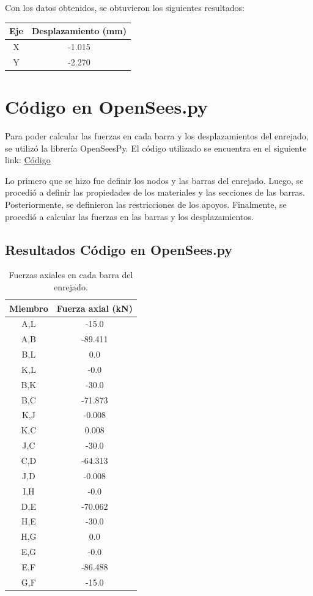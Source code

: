 \documentclass{article}  %
\begin{document}
Con los datos obtenidos, se obtuvieron los siguientes resultados:

\begin{table}[h]
  \centering
  
  \begin{tabular}{cc}
    \hline
    \textbf{Eje} & \textbf{Desplazamiento (mm)} \\
    \hline
    X & -1.015 \\
    Y & -2.270 \\
    \hline
  \end{tabular}
\end{table}

\newpage
\section{Código en OpenSees.py}
Para poder calcular las fuerzas en cada barra y los desplazamientos del enrejado, se utilizó la librería OpenSeesPy. El código utilizado se encuentra en el siguiente link: \href{https://github.com/berckanala/P2E0_MCOC/tree/main/c%C3%B3digo}{Código}

Lo primero que se hizo fue definir los nodos y las barras del enrejado. Luego, se procedió a definir las propiedades de los materiales y las secciones de las barras. Posteriormente, se definieron las restricciones de los apoyos. Finalmente, se procedió a calcular las fuerzas en las barras y los desplazamientos.

\subsection{Resultados Código en OpenSees.py}
\begin{table}[h!]
  \centering
  \begin{tabular}{|c|c|}
  \hline
  \textbf{Miembro} & \textbf{Fuerza axial (kN)} \\
  \hline
  A,L & -15.0   \\
  A,B & -89.411 \\
  B,L & 0.0     \\
  K,L & -0.0    \\
  B,K & -30.0   \\
  B,C & -71.873 \\
  K,J & -0.008  \\
  K,C & 0.008   \\
  J,C & -30.0   \\
  C,D & -64.313 \\
  J,D & -0.008  \\
  I,H & -0.0    \\
  D,E & -70.062 \\
  H,E & -30.0   \\
  H,G & 0.0     \\
  E,G & -0.0    \\
  E,F & -86.488 \\
  G,F & -15.0   \\
  \hline
  \end{tabular}
  \caption{Fuerzas axiales en cada barra del enrejado.}
  \label{tab:2}
\end{table}
\end{document}
